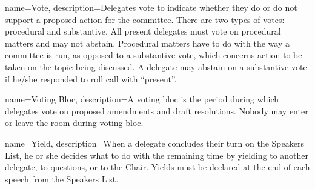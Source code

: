 {
	name={Vote},
	description={Delegates vote to indicate whether they do or do not support a proposed action for the committee. There are two types of votes: procedural and substantive. All present delegates must vote on procedural matters and may not abstain. Procedural matters have to do with the way a committee is run, as opposed to a substantive vote, which concerns action to be taken on the topic being discussed. A delegate may abstain on a substantive vote if he/she responded to roll call with ``present''.}
}

{
	name={Voting Bloc},
	description={A voting bloc is the period during which delegates vote on proposed amendments and draft resolutions. Nobody may enter or leave the room during voting bloc.}
}

{
	name={Yield},
	description={When a delegate concludes their turn on the Speakers List, he or she decides what to do with the remaining time by yielding to another delegate, to questions, or to the Chair. Yields must be declared at the end of each speech from the Speakers List.}
}


